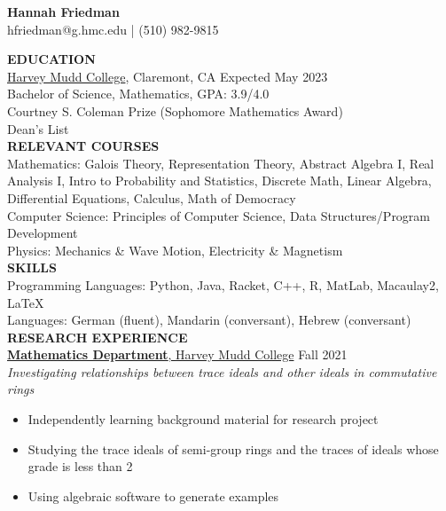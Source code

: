 \documentclass[11pt]{article}
\newcommand{\hdr}[1]{\textcolor{blue(ryb)}{\textbf{#1}}}
\newcommand{\role}[3]{\underline{\textbf{#1}, {#2}} \hfill #3}
\begin{document}
\begin{center}
\hdr{\Large{Hannah Friedman}}\\
hfriedman@g.hmc.edu | (510) 982-9815\\
\end{center}
\medskip
\raggedright
\hdr{EDUCATION}\\
\underline{Harvey Mudd College}, Claremont, CA \hfill Expected May 2023\\
Bachelor of Science, Mathematics, GPA: 3.9/4.0\\
Courtney  S. Coleman Prize (Sophomore Mathematics Award)\\
Dean's List\\
\bigskip
\hdr{RELEVANT COURSES}\\
Mathematics: Galois Theory, Representation Theory, Abstract Algebra I, Real Analysis I, Intro to Probability and Statistics, Discrete Math, Linear Algebra, Differential Equations, Calculus, Math of Democracy\\
Computer Science: Principles of Computer Science, Data Structures/Program Development\\
Physics: Mechanics \& Wave Motion, Electricity \& Magnetism
\bigskip\\
\hdr{SKILLS}\\
Programming Languages: Python, Java, Racket, C++, R, MatLab, Macaulay2, LaTeX\\
Languages: German (fluent), Mandarin (conversant), Hebrew (conversant)
\bigskip\\
\hdr{RESEARCH EXPERIENCE}\\
\role{Mathematics Department}{Harvey Mudd College}{Fall 2021}\\
\textit{Investigating relationships between trace ideals and other ideals in commutative rings}
\begin{itemize}
  \item Independently learning background material for research project
  \item Studying the trace ideals of semi-group rings and the traces of ideals whose grade is less than 2
  \item Using algebraic software to generate examples
\end{itemize}
\end{document}
